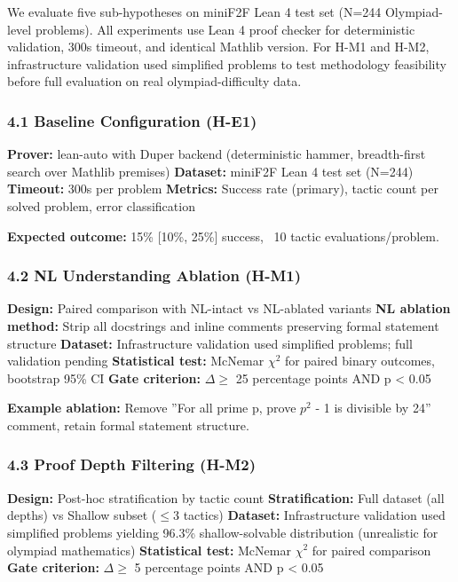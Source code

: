 
We evaluate five sub-hypotheses on miniF2F Lean 4 test set (N=244 Olympiad-level problems). All experiments use Lean 4 proof checker for deterministic validation, 300s timeout, and identical Mathlib version. For H-M1 and H-M2, infrastructure validation used simplified problems to test methodology feasibility before full evaluation on real olympiad-difficulty data.

\subsubsection{4.1 Baseline Configuration (H-E1)}

\textbf{Prover:} lean-auto with Duper backend (deterministic hammer, breadth-first search over Mathlib premises)  
\textbf{Dataset:} miniF2F Lean 4 test set (N=244)  
\textbf{Timeout:} 300s per problem  
\textbf{Metrics:} Success rate (primary), tactic count per solved problem, error classification

\textbf{Expected outcome:} 15\% [10\%, 25\%] success, ~10 tactic evaluations/problem.

\subsubsection{4.2 NL Understanding Ablation (H-M1)}

\textbf{Design:} Paired comparison with NL-intact vs NL-ablated variants  
\textbf{NL ablation method:} Strip all docstrings and inline comments preserving formal statement structure  
\textbf{Dataset:} Infrastructure validation used simplified problems; full validation pending  
\textbf{Statistical test:} McNemar $\chi^2$ for paired binary outcomes, bootstrap 95\% CI  
\textbf{Gate criterion:} $\Delta \geq$ 25 percentage points AND p < 0.05

\textbf{Example ablation:} Remove ''For all prime p, prove $p^2$ - 1 is divisible by 24'' comment, retain formal statement structure.

\subsubsection{4.3 Proof Depth Filtering (H-M2)}

\textbf{Design:} Post-hoc stratification by tactic count  
\textbf{Stratification:} Full dataset (all depths) vs Shallow subset ($\leq 3$ tactics)  
\textbf{Dataset:} Infrastructure validation used simplified problems yielding 96.3\% shallow-solvable distribution (unrealistic for olympiad mathematics)  
\textbf{Statistical test:} McNemar $\chi^2$ for paired comparison  
\textbf{Gate criterion:} $\Delta \geq$ 5 percentage points AND p < 0.05

